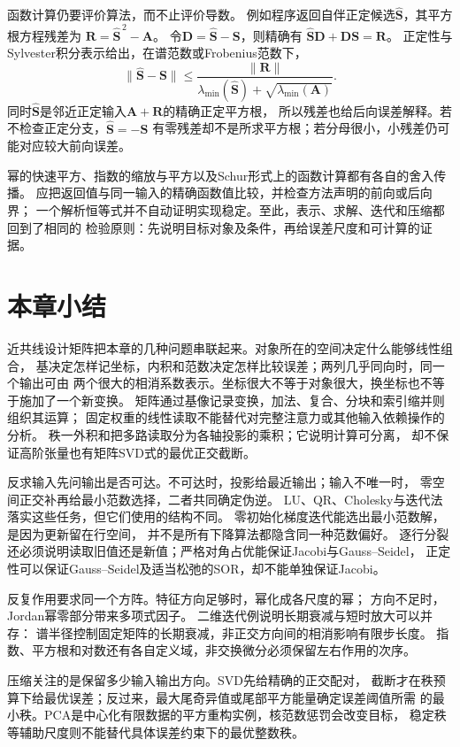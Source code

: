 函数计算仍要评价算法，而不止评价导数。
例如程序返回自伴正定候选$\widehat{\bm S}$，其平方根方程残差为
$\bm R=\widehat{\bm S}^{\,2}-\bm A$。
令$\bm D=\widehat{\bm S}-\bm S$，则精确有
$\widehat{\bm S}\bm D+\bm D\bm S=\bm R$。
正定性与Sylvester积分表示给出，在谱范数或Frobenius范数下，
\[
 \lVert\widehat{\bm S}-\bm S\rVert
 \leq\frac{\lVert\bm R\rVert}
 {\lambda_{\min}(\widehat{\bm S})+\sqrt{\lambda_{\min}(\bm A)}}.
\]
同时$\widehat{\bm S}$是邻近正定输入$\bm A+\bm R$的精确正定平方根，
所以残差也给后向误差解释。若不检查正定分支，$\widehat{\bm S}=-\bm S$
有零残差却不是所求平方根；若分母很小，小残差仍可能对应较大前向误差。

幂的快速平方、指数的缩放与平方以及Schur形式上的函数计算都有各自的舍入传播。
应把返回值与同一输入的精确函数值比较，并检查方法声明的前向或后向界；
一个解析恒等式并不自动证明实现稳定。至此，表示、求解、迭代和压缩都回到了相同的
检验原则：先说明目标对象及条件，再给误差尺度和可计算的证据。

\section{本章小结}
\label{sec:linear-algebra-summary}
\label{sec:matrix-analysis-summary}


近共线设计矩阵把本章的几种问题串联起来。对象所在的空间决定什么能够线性组合，
基决定怎样记坐标，内积和范数决定怎样比较误差；两列几乎同向时，同一个输出可由
两个很大的相消系数表示。坐标很大不等于对象很大，换坐标也不等于施加了一个新变换。
矩阵通过基像记录变换，加法、复合、分块和索引缩并则组织其运算；
固定权重的线性读取不能替代对完整注意力或其他输入依赖操作的分析。
秩一外积和把多路读取分为各轴投影的乘积；它说明计算可分离，
却不保证高阶张量也有矩阵SVD式的最优正交截断。

反求输入先问输出是否可达。不可达时，投影给最近输出；输入不唯一时，
零空间正交补再给最小范数选择，二者共同确定伪逆。
LU、QR、Cholesky与迭代法落实这些任务，但它们使用的结构不同。
零初始化梯度迭代能选出最小范数解，是因为更新留在行空间，
并不是所有下降算法都隐含同一种范数偏好。
逐行分裂还必须说明读取旧值还是新值；严格对角占优能保证Jacobi与Gauss--Seidel，
正定性可以保证Gauss--Seidel及适当松弛的SOR，却不能单独保证Jacobi。

反复作用要求同一个方阵。特征方向足够时，幂化成各尺度的幂；
方向不足时，Jordan幂零部分带来多项式因子。
二维迭代例说明长期衰减与短时放大可以并存：
谱半径控制固定矩阵的长期衰减，非正交方向间的相消影响有限步长度。
指数、平方根和对数还有各自定义域，非交换微分必须保留左右作用的次序。

压缩关注的是保留多少输入输出方向。SVD先给精确的正交配对，
截断才在秩预算下给最优误差；反过来，最大尾奇异值或尾部平方能量确定误差阈值所需
的最小秩。PCA是中心化有限数据的平方重构实例，核范数惩罚会改变目标，
稳定秩等辅助尺度则不能替代具体误差约束下的最优整数秩。

